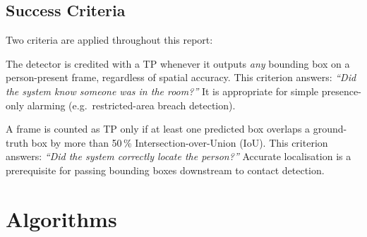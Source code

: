 \documentclass[11pt, a4paper]{article}
\begin{document}
\subsection{Success Criteria}

Two criteria are applied throughout this report:

\begin{description}[leftmargin=2.5em, style=nextline]
    \item[Criterion A — Frame-level presence (no IoU):]
        The detector is credited with a TP whenever it outputs \emph{any} bounding box
        on a person-present frame, regardless of spatial accuracy.  This criterion
        answers: \emph{``Did the system know someone was in the room?''}  It is
        appropriate for simple presence-only alarming (e.g.\ restricted-area breach
        detection).

    \item[Criterion B — Localisation (IoU\,$>\,0.5$):]
        A frame is counted as TP only if at least one predicted box overlaps a
        ground-truth box by more than 50\,\% Intersection-over-Union (IoU).  This
        criterion answers: \emph{``Did the system correctly locate the person?''}
        Accurate localisation is a prerequisite for passing bounding boxes downstream
        to contact detection.
\end{description}

\section{Algorithms}
\end{document}
